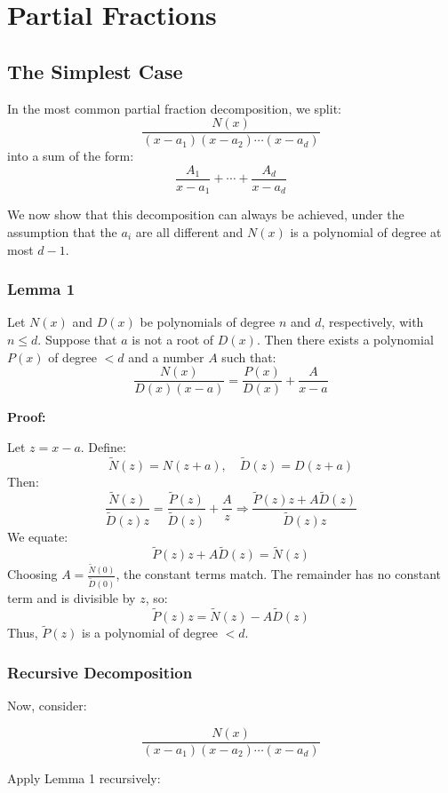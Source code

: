 \newpage
\section{Partial Fractions}

\subsection{The Simplest Case}

In the most common partial fraction decomposition, we split:
\[
\frac{N(x)}{(x - a_1)(x - a_2)\cdots(x - a_d)}
\]
into a sum of the form:
\[
\frac{A_1}{x - a_1} + \cdots + \frac{A_d}{x - a_d}
\]

We now show that this decomposition can always be achieved, under the assumption that the \(a_i\) are all different and \(N(x)\) is a polynomial of degree at most \(d - 1\).

\subsubsection{Lemma 1}

Let \(N(x)\) and \(D(x)\) be polynomials of degree \(n\) and \(d\), respectively, with \(n \leq d\). Suppose that \(a\) is not a root of \(D(x)\). Then there exists a polynomial \(P(x)\) of degree \(< d\) and a number \(A\) such that:
\[
\frac{N(x)}{D(x)(x - a)} = \frac{P(x)}{D(x)} + \frac{A}{x - a}
\]

\textbf{Proof:} 

Let \(z = x - a\). Define:
\[
\tilde{N}(z) = N(z + a), \quad \tilde{D}(z) = D(z + a)
\]
Then:
\[
\frac{\tilde{N}(z)}{\tilde{D}(z)z} = \frac{\tilde{P}(z)}{\tilde{D}(z)} + \frac{A}{z}
\Rightarrow \frac{\tilde{P}(z)z + A\tilde{D}(z)}{\tilde{D}(z)z}
\]
We equate:
\[
\tilde{P}(z)z + A\tilde{D}(z) = \tilde{N}(z)
\]
Choosing \(A = \frac{\tilde{N}(0)}{\tilde{D}(0)}\), the constant terms match. The remainder has no constant term and is divisible by \(z\), so:
\[
\tilde{P}(z)z = \tilde{N}(z) - A\tilde{D}(z)
\]
Thus, \(\tilde{P}(z)\) is a polynomial of degree \(< d\).

\subsubsection{Recursive Decomposition}

Now, consider:

\[
\frac{N(x)}{(x - a_1)(x - a_2)\cdots(x - a_d)}
\]

Apply Lemma 1 recursively:

